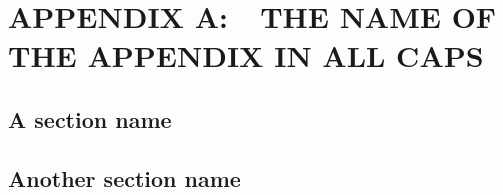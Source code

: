 
\titlespacing{\chapter}{0in}{-.32in}{0pt}
\chapter*{APPENDIX A:~~THE NAME OF THE APPENDIX IN ALL CAPS}\label{ch:appendixA}
\setcounter{chapter}{1}

\lipsum[1]

\section{A section name}
\lipsum[3]

\section{Another section name}
\lipsum[4]
